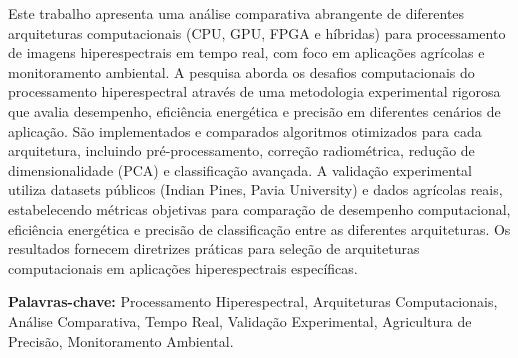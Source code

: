 \documentclass[Portugues,Final]{tese-FT}
\begin{document}
%

\paginasiniciais

 

\ifturnitin
   \relax 
\else


\begin{resumo}
Este trabalho apresenta uma análise comparativa abrangente de diferentes arquiteturas computacionais (CPU, GPU, FPGA e híbridas) para processamento de imagens hiperespectrais em tempo real, com foco em aplicações agrícolas e monitoramento ambiental. A pesquisa aborda os desafios computacionais do processamento hiperespectral através de uma metodologia experimental rigorosa que avalia desempenho, eficiência energética e precisão em diferentes cenários de aplicação. São implementados e comparados algoritmos otimizados para cada arquitetura, incluindo pré-processamento, correção radiométrica, redução de dimensionalidade (PCA) e classificação avançada. A validação experimental utiliza datasets públicos (Indian Pines, Pavia University) e dados agrícolas reais, estabelecendo métricas objetivas para comparação de desempenho computacional, eficiência energética e precisão de classificação entre as diferentes arquiteturas. Os resultados fornecem diretrizes práticas para seleção de arquiteturas computacionais em aplicações hiperespectrais específicas.

\textbf{Palavras-chave:} Processamento Hiperespectral, Arquiteturas Computacionais, Análise Comparativa, Tempo Real, Validação Experimental, Agricultura de Precisão, Monitoramento Ambiental.
\end{resumo}
\end{document}

